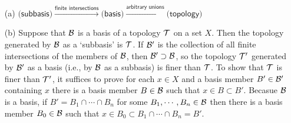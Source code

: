 \begin{rmk}
    \begin{enumerate}
        \item[(a)]
        {
            $
            \textsf{(subbasis)}\xrightarrow{\textsf{finite intersections}}
            \textsf{(basis)}\xrightarrow{\textsf{arbitrary unions}}
            \textsf{(topology)}
            $
        }
        \item[(b)]
        {
            Suppose that ${\mathcal{B}}$ is a basis of a topology ${\mathcal{T}}$ on a set $X$.
            Then the topology generated by ${\mathcal{B}}$ as a `subbasis' is ${\mathcal{T}}$.
            If ${\mathcal{B}}'$ is the collection of all finite intersections of the members of ${\mathcal{B}}$, then ${\mathcal{B}}'\supset{\mathcal{B}}$, so the topology ${\mathcal{T}}'$ generated by ${\mathcal{B}}'$ as a basis (i.e., by ${\mathcal{B}}$ as a subbasis) is finer than ${\mathcal{T}}$.
            To show that ${\mathcal{T}}$ is finer than ${\mathcal{T}}'$, it suffices to prove for each $x\in X$ and a basis member $B'\in{\mathcal{B}}'$ containing $x$ there is a basis member $B\in{\mathcal{B}}$ such that $x\in B\subset B'$.
            Becasue ${\mathcal{B}}$ is a basis, if $B'=B_1\cap\cdots\cap B_n$ for some $B_1, \cdots, B_n\in{\mathcal{B}}$ then there is a basis member $B_0\in{\mathcal{B}}$ such that $x\in B_0\subset B_1\cap\cdots\cap B_n=B'$.
        }
    \end{enumerate}
\end{rmk}